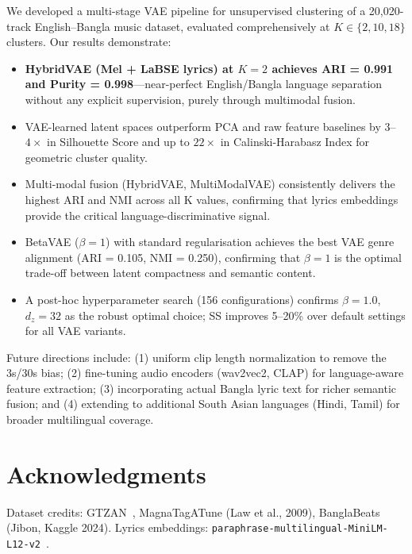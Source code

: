 \documentclass{article}
\begin{document}
We developed a multi-stage VAE pipeline for unsupervised clustering of a 20,020-track English--Bangla music dataset, evaluated comprehensively at $K\!\in\!\{2,10,18\}$ clusters. Our results demonstrate:
\begin{itemize}
    \item \textbf{HybridVAE (Mel + LaBSE lyrics) at $K\!=\!2$ achieves ARI = 0.991 and Purity = 0.998}---near-perfect English/Bangla language separation without any explicit supervision, purely through multimodal fusion.
    \item VAE-learned latent spaces outperform PCA and raw feature baselines by $3$--$4\times$ in Silhouette Score and up to $22\times$ in Calinski-Harabasz Index for geometric cluster quality.
    \item Multi-modal fusion (HybridVAE, MultiModalVAE) consistently delivers the highest ARI and NMI across all K values, confirming that lyrics embeddings provide the critical language-discriminative signal.
    \item BetaVAE ($\beta\!=\!1$) with standard regularisation achieves the best VAE genre alignment (ARI = 0.105, NMI = 0.250), confirming that $\beta\!=\!1$ is the optimal trade-off between latent compactness and semantic content.
    \item A post-hoc hyperparameter search (156 configurations) confirms $\beta\!=\!1.0$, $d_z\!=\!32$ as the robust optimal choice; SS improves 5--20\% over default settings for all VAE variants.
\end{itemize}

Future directions include: (1) uniform clip length normalization to remove the 3s/30s bias; (2) fine-tuning audio encoders (wav2vec2, CLAP) for language-aware feature extraction; (3) incorporating actual Bangla lyric text for richer semantic fusion; and (4) extending to additional South Asian languages (Hindi, Tamil) for broader multilingual coverage.

\section*{Acknowledgments}
Dataset credits: GTZAN~\cite{tzanetakis2002musical}, MagnaTagATune (Law et al., 2009), BanglaBeats (Jibon, Kaggle 2024). Lyrics embeddings: \texttt{paraphrase-multilingual-MiniLM-L12-v2}~\cite{reimers2019sentence}.
\end{document}
